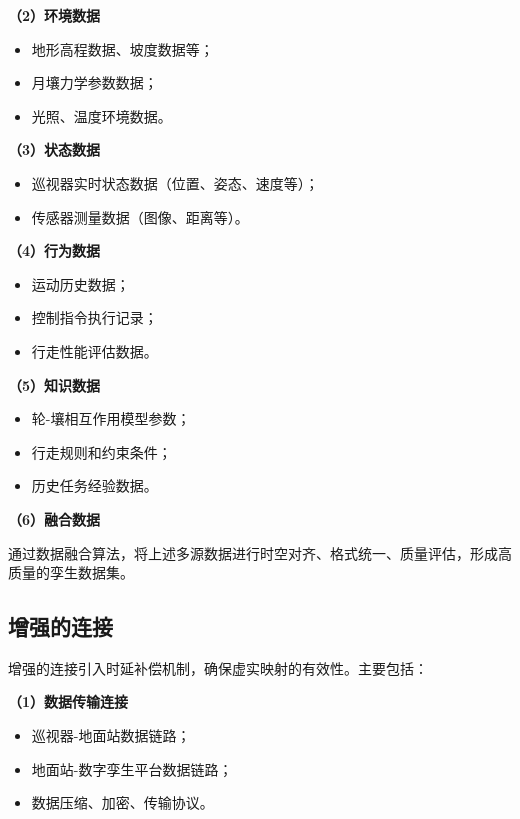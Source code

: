 \textbf{（2）环境数据}

\begin{itemize}
    \item 地形高程数据、坡度数据等；
    \item 月壤力学参数数据；
    \item 光照、温度环境数据。
\end{itemize}

\textbf{（3）状态数据}

\begin{itemize}
    \item 巡视器实时状态数据（位置、姿态、速度等）；
    \item 传感器测量数据（图像、距离等）。
\end{itemize}

\textbf{（4）行为数据}

\begin{itemize}
    \item 运动历史数据；
    \item 控制指令执行记录；
    \item 行走性能评估数据。
\end{itemize}

\textbf{（5）知识数据}

\begin{itemize}
    \item 轮-壤相互作用模型参数；
    \item 行走规则和约束条件；
    \item 历史任务经验数据。
\end{itemize}

\textbf{（6）融合数据}

通过数据融合算法，将上述多源数据进行时空对齐、格式统一、质量评估，形成高质量的孪生数据集。

\subsection{增强的连接}
\label{subsec:enhanced_connection}

增强的连接引入时延补偿机制，确保虚实映射的有效性。主要包括：

\textbf{（1）数据传输连接}

\begin{itemize}
    \item 巡视器-地面站数据链路；
    \item 地面站-数字孪生平台数据链路；
    \item 数据压缩、加密、传输协议。
\end{itemize}

